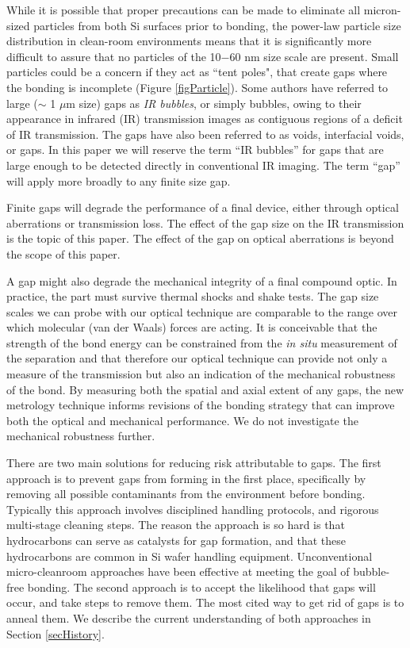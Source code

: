 \documentclass[osajnl,preprint,showpacs,superscriptaddress,12pt]{revtex4-1} %
\begin{document}
While it is possible that proper precautions can be made to eliminate all micron-sized particles from both Si surfaces prior to bonding, the power-law particle size distribution in clean-room environments \cite{doi:10.1080/02786828608959094} means that it is significantly more difficult to assure that no particles of the 10$-$60 nm size scale are present.  Small particles could be a concern if they act as ``tent poles", that create gaps where the bonding is incomplete (Figure \ref{figParticle}).  Some authors \cite{1991JaJAP..30..615M, 1992JEMat..21..669M, 1989JaJAP..28L2141L, Mitani1990} have referred to large ($\sim$ 1 $\mu$m size) gaps as \emph{IR bubbles}, or simply bubbles, owing to their appearance in infrared (IR) transmission images as contiguous regions of a deficit of IR transmission.  The gaps have also been referred to as voids\cite{2000RScI...71.1869G}, interfacial voids, or gaps.  In this paper we will reserve the term ``IR bubbles'' for gaps that are large enough to be detected directly in conventional IR imaging.  The term ``gap'' will apply more broadly to any finite size gap.

Finite gaps will degrade the performance of a final device, either through optical aberrations or transmission loss.  The effect of the gap size on the IR transmission is the topic of this paper.  The effect of the gap on optical aberrations is beyond the scope of this paper.  

A gap might also degrade the mechanical integrity of a final compound optic.  In practice, the part must survive thermal shocks and shake tests.  The gap size scales we can probe with our optical technique are comparable to the range over which molecular (van der Waals) forces are acting.  It is conceivable that the strength of the bond energy can be constrained from the \emph{in situ} measurement of the separation and that therefore our optical technique can provide not only a measure of the transmission but also an indication of the mechanical robustness of the bond.  By measuring both the spatial and axial extent of any gaps, the new metrology technique informs revisions of the bonding strategy that can improve both the optical and mechanical performance.  We do not investigate the mechanical robustness further.  

There are two main solutions for reducing risk attributable to gaps.  The first approach is to prevent gaps from forming in the first place, specifically by removing all possible contaminants from the environment before bonding.  Typically this approach involves disciplined handling protocols, and rigorous multi-stage cleaning steps.  The reason the approach is so hard is that hydrocarbons can serve as catalysts for gap formation\cite{1991JaJAP..30..615M}, and that these hydrocarbons are common in Si wafer handling equipment.  Unconventional micro-cleanroom approaches have been effective at meeting the goal of bubble-free bonding\cite{1989JaJAP..28L2141L}.  The second approach is to accept the likelihood that gaps will occur, and take steps to remove them.  The most cited way to get rid of gaps is to anneal them\cite{Mitani1990}.  We describe the current understanding of both approaches in Section \ref{secHistory}.
\end{document}
